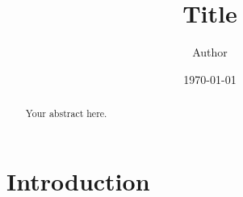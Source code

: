 \documentclass{article}
\title{Title}
\author{Author}
\date{\today}
\begin{document}
\maketitle

\begin{abstract}
Your abstract here.
\end{abstract}

\section{Introduction}
\label{sec:introduction}
\end{document}
